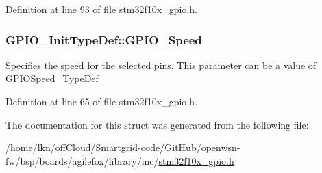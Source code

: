 Definition at line 93 of file stm32f10x\+\_\+gpio.\+h.

\subsubsection[{\texorpdfstring{G\+P\+I\+O\+\_\+\+Speed}{GPIO_Speed}}]{ G\+P\+I\+O\+\_\+\+Init\+Type\+Def\+::\+G\+P\+I\+O\+\_\+\+Speed}\hypertarget{struct_g_p_i_o___init_type_def_ac05832cacebc861a9acf5294d702c16b}{}\label{struct_g_p_i_o___init_type_def_ac05832cacebc861a9acf5294d702c16b}
Specifies the speed for the selected pins. This parameter can be a value of \hyperlink{openmotestm_2library_2inc_2stm32f10x__gpio_8h_a062ad92b67b4a1f301c161022cf3ba8e}{G\+P\+I\+O\+Speed\+\_\+\+Type\+Def} 

Definition at line 65 of file stm32f10x\+\_\+gpio.\+h.



The documentation for this struct was generated from the following file\+:\begin{DoxyCompactItemize}
\item 
/home/lkn/off\+Cloud/\+Smartgrid-\/code/\+Git\+Hub/openwsn-\/fw/bsp/boards/agilefox/library/inc/\hyperlink{agilefox_2library_2inc_2stm32f10x__gpio_8h}{stm32f10x\+\_\+gpio.\+h}\end{DoxyCompactItemize}
